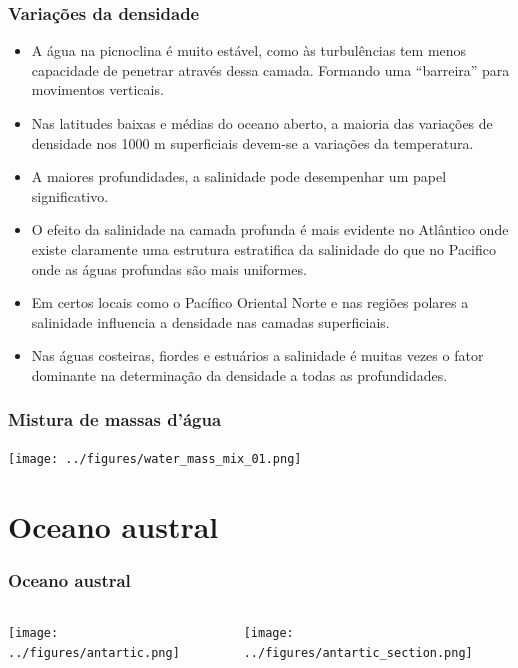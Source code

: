 \begin{frame}
\frametitle{Variações da densidade}
\scriptsize{
  \begin{itemize}[<+-| alert@+>]
    \item A água na picnoclina é muito estável, como às turbulências tem menos
          capacidade de penetrar através dessa camada.  Formando uma ``barreira'' para movimentos verticais.
    \item Nas latitudes baixas e médias do oceano aberto, a maioria das
          variações de densidade nos 1000 m superficiais devem-se a variações
          da temperatura.
    \item A maiores profundidades, a salinidade pode desempenhar um papel
          significativo.
    \item O efeito da salinidade na camada profunda é mais evidente no
          Atlântico onde existe claramente uma estrutura estratifica da
          salinidade do que no Pacifico onde as águas profundas são mais
          uniformes.
    \item Em certos locais como o Pacífico Oriental Norte e nas regiões polares
          a salinidade influencia a densidade nas camadas superficiais.
    \item Nas águas costeiras, fiordes e estuários a salinidade é muitas vezes
          o fator dominante na determinação da densidade a todas as
          profundidades.
  \end{itemize}
  }
\end{frame}


\begin{frame}
\frametitle{Mistura de massas d'água}
  \begin{center}
    \texttt{[image: ../figures/water\_mass\_mix\_01.png]}
  \end{center}
\end{frame}


\section{Oceano austral}
\begin{frame}
\frametitle{Oceano austral}
  \begin{columns}
    \begin{column}{0.7\textwidth}
      \texttt{[image: ../figures/antartic.png]}
    \end{column}

    \begin{column}{0.3\textwidth}
      \texttt{[image: ../figures/antartic\_section.png]}
    \end{column}
  \end{columns}
\end{frame}


